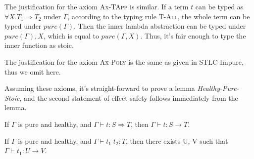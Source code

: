 The justification for the axiom \textsc{Ax-TApp} is similar. If a term
$t$ can be typed as $\forall X.T_1 \Rightarrow T_2$ under $\Gamma$,
according to the typing rule \textsc{T-All}, the whole term can be
typed under $pure(\Gamma)$. Then the inner lambda abstraction can be
typed under $pure(\Gamma), X$, which is equal to $pure(\Gamma,
X)$. Thus, it's fair enough to type the inner function as stoic.

The justification for the axiom \textsc{Ax-Poly} is the same as given
in STLC-Impure, thus we omit here.

Assuming these axioms, it's straight-forward to prove a lemma
\emph{Healthy-Pure-Stoic}, and the second statement of effect safety
follows immediately from the lemma.

\begin{lemma}
  If $\Gamma$ is pure and healthy,  and $\Gamma \vdash t : S
  \Rightarrow T$, then $\Gamma \vdash t : S \to T$.
\end{lemma}

\begin{theorem}
  If $\Gamma$ is pure and healthy, and $\Gamma \vdash t_1 \; t_2 : T$,
  then there exists U, V such that $\Gamma \vdash t_1 : U \to V$.
\end{theorem}
